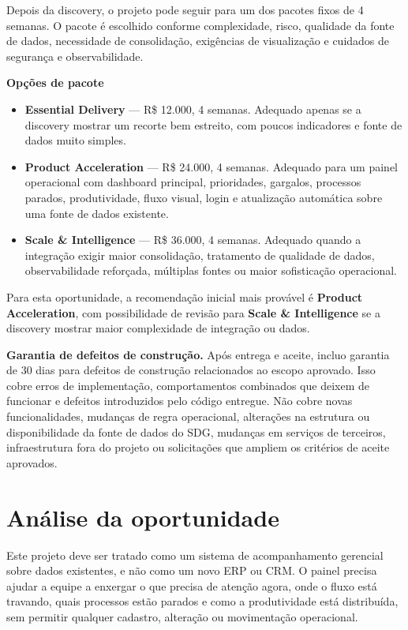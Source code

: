 \documentclass[11pt,a4paper]{article}
\begin{document}
Depois da discovery, o projeto pode seguir para um dos pacotes fixos de 4 semanas. O pacote é escolhido conforme complexidade, risco, qualidade da fonte de dados, necessidade de consolidação, exigências de visualização e cuidados de segurança e observabilidade.\par

\textbf{Opções de pacote}\par

\begin{itemize}
\item \textbf{Essential Delivery} --- R\$ 12.000, 4 semanas. Adequado apenas se a discovery mostrar um recorte bem estreito, com poucos indicadores e fonte de dados muito simples.
\item \textbf{Product Acceleration} --- R\$ 24.000, 4 semanas. Adequado para um painel operacional com dashboard principal, prioridades, gargalos, processos parados, produtividade, fluxo visual, login e atualização automática sobre uma fonte de dados existente.
\item \textbf{Scale \& Intelligence} --- R\$ 36.000, 4 semanas. Adequado quando a integração exigir maior consolidação, tratamento de qualidade de dados, observabilidade reforçada, múltiplas fontes ou maior sofisticação operacional.
\end{itemize}

Para esta oportunidade, a recomendação inicial mais provável é \textbf{Product Acceleration}, com possibilidade de revisão para \textbf{Scale \& Intelligence} se a discovery mostrar maior complexidade de integração ou dados.\par

\textbf{Garantia de defeitos de construção.} Após entrega e aceite, incluo garantia de 30 dias para defeitos de construção relacionados ao escopo aprovado. Isso cobre erros de implementação, comportamentos combinados que deixem de funcionar e defeitos introduzidos pelo código entregue. Não cobre novas funcionalidades, mudanças de regra operacional, alterações na estrutura ou disponibilidade da fonte de dados do SDG, mudanças em serviços de terceiros, infraestrutura fora do projeto ou solicitações que ampliem os critérios de aceite aprovados.\par

\section*{Análise da oportunidade}

Este projeto deve ser tratado como um sistema de acompanhamento gerencial sobre dados existentes, e não como um novo ERP ou CRM. O painel precisa ajudar a equipe a enxergar o que precisa de atenção agora, onde o fluxo está travando, quais processos estão parados e como a produtividade está distribuída, sem permitir qualquer cadastro, alteração ou movimentação operacional.\par
\end{document}

